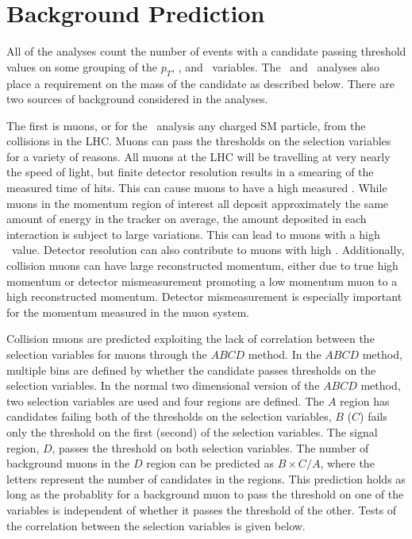 \section{Background Prediction \label{BackPred}}
All of the analyses count the number of events with a candidate passing threshold values on some grouping of the $p_T$, \invbeta, 
and \ias\ variables. The \tktof\  and \tkonly\ analyses also place a requirement on the mass of the candidate as described below. There are two sources
of background considered in the analyses. 

The first is muons, or for the \tkonly\ analysis any charged SM particle, from the collisions in the LHC. Muons can pass the thresholds on the selection variables
for a variety of reasons.
All muons at the LHC will be travelling at very nearly the speed of light,
but finite detector resolution results in a smearing of the measured time of hits. This can cause muons to have a high measured \invbeta.
While muons in the momentum region of interest all deposit approximately
the same amount of energy in the tracker on average, the amount deposited in each interaction is subject to large variations. This can lead to muons
with a high \dedx\ value. Detector resolution can also contribute to muons with high \dedx.
Additionally, collision muons can have large reconstructed momentum, either due to true high momentum or detector mismeasurement
promoting a low momentum muon to a high reconstructed momentum. Detector mismeasurement is especially important for the momentum measured in the muon system.

Collision muons are predicted exploiting the lack of correlation between the selection variables for muons through the $ABCD$ method.
In the $ABCD$ method, multiple bins are defined by whether the candidate passes thresholds on the selection variables. In the normal two dimensional version
of the $ABCD$ method, two selection variables are used and four regions are defined. The $A$ region has candidates failing both of the thresholds on the selection
variables, $B$ ($C$) fails only the threshold on the first (second) of the selection variables. The signal region, $D$, passes the threshold on both selection
variables. The number of background muons in the $D$ region can be predicted as $B \times C / A$, where the letters represent the number of candidates in the regions.
This prediction holds as long as the probablity for a background
muon to pass the threshold on one of the variables is independent of whether it passes the threshold of the other. Tests of the correlation between the selection variables is
given below.

